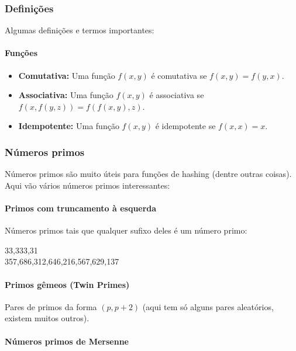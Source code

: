 \subsubsection{Definições}

Algumas definições e termos importantes:

\paragraph{Funções}

\begin{itemize}\setlength\itemsep{0pt}
    \item \textbf{Comutativa:} Uma função $f(x, y)$ é comutativa se $f(x, y) = f(y, x)$.
    \item \textbf{Associativa:} Uma função $f(x, y)$ é associativa se $f(x, f(y, z)) = f(f(x, y), z)$.
    \item \textbf{Idempotente:} Uma função $f(x, y)$ é idempotente se $f(x, x) = x$.
\end{itemize}

\subsubsection{Números primos}

Números primos são muito úteis para funções de hashing (dentre outras coisas). Aqui vão vários números primos interessantes:

\paragraph{Primos com truncamento à esquerda}

Números primos tais que qualquer sufixo deles é um número primo:
\begin{center}
33,333,31\\
357,686,312,646,216,567,629,137
\end{center}

\paragraph{Primos gêmeos (Twin Primes)}

Pares de primos da forma $(p, p+2)$ (aqui tem só alguns pares aleatórios, existem muitos outros).

\paragraph{Números primos de Mersenne}

